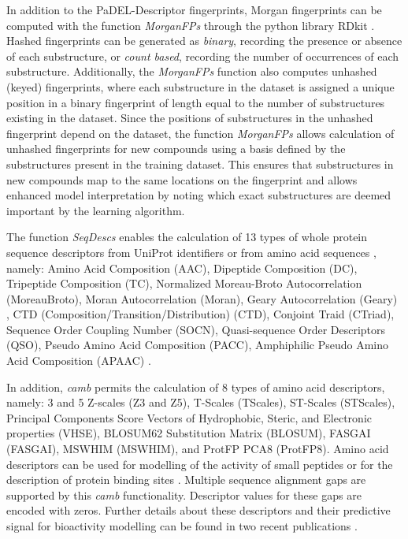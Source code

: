 \documentclass[twoside,a4wide,10pt]{article}
\begin{document}
In addition to the PaDEL-Descriptor fingerprints, Morgan fingerprints can be computed with the function {\it MorganFPs}
through the python library RDkit \citep{rdkit}.
Hashed fingerprints can be generated as \textit{binary}, recording the presence or absence of each substructure,
or \textit{count based}, recording the number of occurrences of each substructure.
Additionally, the {\it MorganFPs} function also computes unhashed (keyed) fingerprints, 
where each substructure in the dataset is assigned a unique position in a binary fingerprint of length equal to the number of substructures existing in the dataset.
Since the positions of substructures in the unhashed fingerprint depend on the dataset, the function {\it MorganFPs} allows calculation of unhashed fingerprints for new compounds using a basis defined by the substructures present in the training dataset.
This ensures that substructures in new compounds map to the same locations on the fingerprint and allows enhanced model interpretation by noting which exact substructures are deemed important by the learning algorithm.

The function {\it SeqDescs} enables the calculation of 13 types of whole protein sequence descriptors
from UniProt identifiers or from amino acid sequences \citep{protr}, namely:
Amino Acid Composition (AAC), Dipeptide Composition (DC), Tripeptide Composition (TC), Normalized Moreau-Broto Autocorrelation (MoreauBroto), Moran Autocorrelation (Moran), Geary Autocorrelation (Geary) , CTD (Composition/Transition/Distribution) (CTD), Conjoint Traid (CTriad), Sequence Order Coupling Number (SOCN), Quasi-sequence Order Descriptors (QSO), Pseudo Amino Acid Composition (PACC), Amphiphilic Pseudo Amino Acid Composition (APAAC) \citep{aadescs2,aadescs1}.

In addition, {\it camb} permits the calculation of 8 types of amino acid descriptors, namely:
3 and 5 Z-scales (Z3 and Z5), T-Scales (TScales), ST-Scales (STScales), 
Principal Components Score Vectors of Hydrophobic, Steric, and Electronic properties (VHSE), 
BLOSUM62 Substitution Matrix (BLOSUM), FASGAI (FASGAI), MSWHIM (MSWHIM), and ProtFP PCA8 (ProtFP8).
Amino acid descriptors can be used for modelling of the activity of small peptides
or for the description of protein binding sites \citep{AA_benchmark,adenosine,cortesCOX,cortesReview}.
Multiple sequence alignment gaps are supported by this {\it camb} functionality.
Descriptor values for these gaps are encoded with zeros.
Further details about these descriptors and their predictive signal
for bioactivity modelling can be found in two recent publications \citep{AA_benchmark1,AA_benchmark}.
\end{document}
